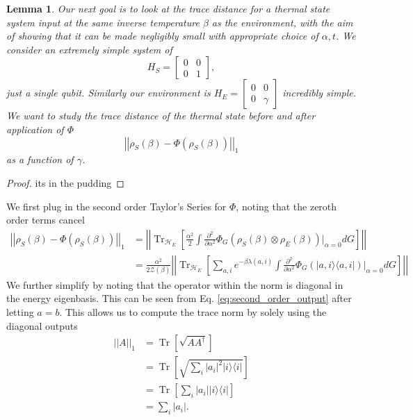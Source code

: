\documentclass{article}
\newtheorem{lemma}[theorem]{Lemma}
\newcommand{\ketbra}[2]{| #1\rangle\! \langle #2|}
\newcommand{\brackets}[1]{\left[ #1 \right]}
\newcommand{\norm}[1]{\left| \left| #1 \right| \right|}
\DeclareMathOperator{\Tr}{Tr}
\newcommand{\trace}[1]{\Tr \brackets{ #1 }}
\newcommand{\partrace}[2]{\Tr_{#1} \brackets{ #2 }}
\newcommand{\hilb}{\mathcal{H}}
\newcommand{\partfun}{\mathcal{Z}}
\begin{document}
\begin{lemma}
    Our next goal is to look at the trace distance for a thermal state system input at the same inverse temperature $\beta$ as the environment, with the aim of showing that it can be made negligibly small with appropriate choice of $\alpha, t$. We consider an extremely simple system of 
    \begin{equation}
        H_S = \begin{bmatrix}
            0 & 0 \\ 0 & 1
        \end{bmatrix},
    \end{equation}
    just a single qubit. Similarly our environment is $H_E = \begin{bmatrix}
        0 & 0 \\ 0 & \gamma
    \end{bmatrix}$ incredibly simple. We want to study the trace distance of the thermal state before and after application of $\Phi$
    \begin{equation}
        \norm{\rho_S(\beta) - \Phi(\rho_S(\beta))}_1
    \end{equation}
    as a function of $\gamma$. 
\end{lemma}
\begin{proof}
its in the pudding    
\end{proof}
We first plug in the second order Taylor's Series for $\Phi$, noting that the zeroth order terms cancel
\begin{align}
    \norm{\rho_S(\beta) - \Phi(\rho_S(\beta))}_1 &= \norm{\partrace{\hilb_E}{ \frac{\alpha^2}{2} \int \frac{\partial^2}{\partial \alpha^2} \Phi_G(\rho_S(\beta) \otimes \rho_E(\beta) ) \bigg|_{\alpha = 0} dG }} \\
    &= \frac{\alpha^2}{2 \partfun(\beta)}\norm{\partrace{\hilb_E}{ \sum_{a, i} e^{-\beta \lambda(a, i)} \int \frac{\partial^2}{\partial \alpha^2} \Phi_G(\ketbra{a,i}{a,i}) \bigg|_{\alpha=0} dG}}
\end{align}
We further simplify by noting that the operator within the norm is diagonal in the energy eigenbasis. This can be seen from Eq. \eqref{eq:second_order_output} after letting $a = b$. This allows us to compute the trace norm by solely using the diagonal outputs
\begin{align}
    \norm{A}_1 &= \trace{\sqrt{A A^\dagger}} \\
    &= \trace{\sqrt{\sum_i |a_i|^2 \ketbra{i}{i}}} \\
    &= \trace{\sum_i |a_i| \ketbra{i}{i}} \\
    &= \sum_i |a_i|.
\end{align}
\end{document}
